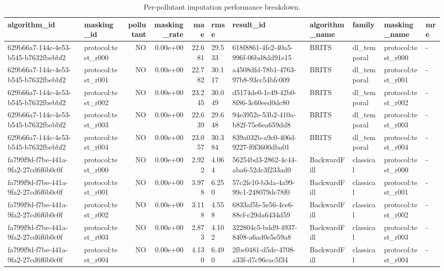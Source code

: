 \begin{table}[htbp]
\centering
\caption{Per-pollutant imputation performance breakdown.}
\label{tab:pollutant_breakdown}
\begin{tabular}{llrrr}
\hline
algorithm\_id & masking\_id & pollutant & masking\_rate & mae & rmse & result\_id & algorithm\_name & family & masking\_name & mre \\
\hline
629b66a7-144c-4e53-b545-b7632fbebbf2 & protocol:test\_r000 & NO & 0.00e+00 & 22.681 & 29.533 & 618f8861-4fe2-40a5-996f-06bd8dd91e15 & BRITS & dl\_temporal & protocol:test\_r000 & - \\
629b66a7-144c-4e53-b545-b7632fbebbf2 & protocol:test\_r001 & NO & 0.00e+00 & 22.782 & 30.117 & a4508dfd-78b1-4763-97b8-93cc54bfc009 & BRITS & dl\_temporal & protocol:test\_r001 & - \\
629b66a7-144c-4e53-b545-b7632fbebbf2 & protocol:test\_r002 & NO & 0.00e+00 & 23.245 & 30.049 & d5174de0-1c49-42b0-8f86-3c60eed0dc80 & BRITS & dl\_temporal & protocol:test\_r002 & - \\
629b66a7-144c-4e53-b545-b7632fbebbf2 & protocol:test\_r003 & NO & 0.00e+00 & 22.639 & 29.648 & 94e3952e-53b2-410a-b82f-75e6ea659dd8 & BRITS & dl\_temporal & protocol:test\_r003 & - \\
629b66a7-144c-4e53-b545-b7632fbebbf2 & protocol:test\_r004 & NO & 0.00e+00 & 23.057 & 30.384 & 839a032b-a9c0-406d-9227-f0f3600dba01 & BRITS & dl\_temporal & protocol:test\_r004 & - \\
fa799f9d-f7be-441a-9fa2-27cd6f6b0c0f & protocol:test\_r000 & NO & 0.00e+00 & 2.922 & 4.064 & 56254bd3-2862-4c44-aba6-52dc3f233ad0 & BackwardFill & classical & protocol:test\_r000 & - \\
fa799f9d-f7be-441a-9fa2-27cd6f6b0c0f & protocol:test\_r001 & NO & 0.00e+00 & 3.978 & 6.250 & 57c2fe10-b3da-4a99-99c1-248079dc78f0 & BackwardFill & classical & protocol:test\_r001 & - \\
fa799f9d-f7be-441a-9fa2-27cd6f6b0c0f & protocol:test\_r002 & NO & 0.00e+00 & 3.118 & 4.558 & 6833af5b-5e56-4ce6-88cf-c29da6434d59 & BackwardFill & classical & protocol:test\_r002 & - \\
fa799f9d-f7be-441a-9fa2-27cd6f6b0c0f & protocol:test\_r003 & NO & 0.00e+00 & 2.873 & 4.102 & 322804c5-bdd9-4937-8408-a6ad0e5e59a8 & BackwardFill & classical & protocol:test\_r003 & - \\
fa799f9d-f7be-441a-9fa2-27cd6f6b0c0f & protocol:test\_r004 & NO & 0.00e+00 & 4.130 & 6.490 & 2fbc0481-d5dc-4708-a33f-d7c96cac5f34 & BackwardFill & classical & protocol:test\_r004 & - \\

\end{tabular}
\end{table}
